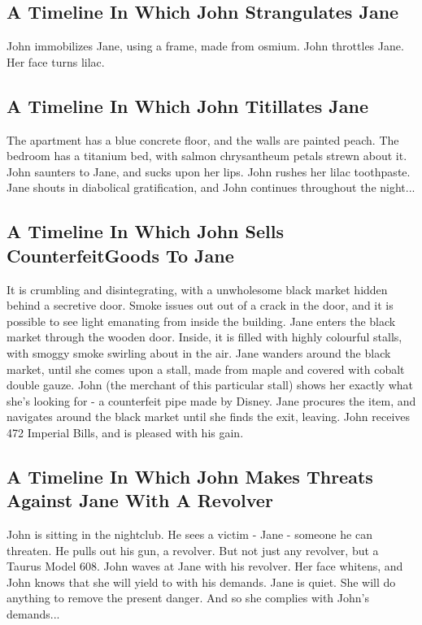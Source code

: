 \documentclass{article}
\begin{document}
\subsection{A Timeline In Which John Strangulates Jane}


John immobilizes Jane, using a frame, made from osmium.
John throttles Jane.
Her face turns lilac.
\subsection{A Timeline In Which John Titillates Jane}


The apartment has a blue concrete floor, and the walls are painted peach.
The bedroom has a titanium bed, with salmon chrysantheum petals strewn about it.
John saunters to Jane, and sucks upon her lips.
John rushes her lilac toothpaste.
Jane shouts in diabolical gratification, and John continues throughout the night...
\subsection{A Timeline In Which John Sells CounterfeitGoods To Jane}


It is crumbling and disintegrating, with a unwholesome black market hidden behind a secretive door.
Smoke issues out out of a crack in the door, and it is possible to see light emanating from inside the building.
Jane enters the black market through the wooden door.
Inside, it is filled with highly colourful stalls, with smoggy smoke swirling about in the air.
Jane wanders around the black market, until she comes upon a stall, made from maple and covered with cobalt double gauze.
John (the merchant of this particular stall) shows her exactly what she's looking for {-} a counterfeit pipe made by Disney.
Jane procures the item, and navigates around the black market until she finds the exit, leaving.
John receives 472 Imperial Bills, and is pleased with his gain.
\subsection{A Timeline In Which John Makes Threats Against Jane With A Revolver}


John is sitting in the nightclub.
He sees a victim {-} Jane {-} someone he can threaten. He pulls out his gun, a revolver.
But not just any revolver, but a Taurus Model 608.
John waves at Jane with his revolver. Her face whitens, and John knows that she will yield to with his demands.
Jane is quiet. She will do anything to remove the present danger. And so she complies with John's demands...
\end{document}
